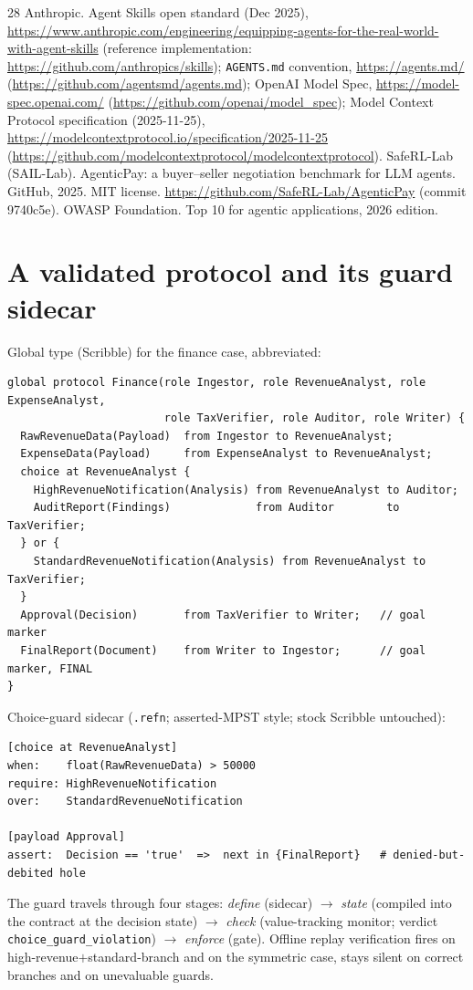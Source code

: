 \documentclass{article}
\begin{document}
\begin{thebibliography}{28}
 Anthropic. Agent Skills open standard (Dec 2025), \url{https://www.anthropic.com/engineering/equipping-agents-for-the-real-world-with-agent-skills} (reference implementation: \url{https://github.com/anthropics/skills}); \texttt{AGENTS.md} convention, \url{https://agents.md/} (\url{https://github.com/agentsmd/agents.md}); OpenAI Model Spec, \url{https://model-spec.openai.com/} (\url{https://github.com/openai/model_spec}); Model Context Protocol specification (2025-11-25), \url{https://modelcontextprotocol.io/specification/2025-11-25} (\url{https://github.com/modelcontextprotocol/modelcontextprotocol}).
 SafeRL-Lab (SAIL-Lab). AgenticPay: a buyer--seller negotiation benchmark for LLM agents. GitHub, 2025. MIT license. \url{https://github.com/SafeRL-Lab/AgenticPay} (commit 9740c5e).
 OWASP Foundation. Top 10 for agentic applications, 2026 edition.
\end{thebibliography}

\appendix
\section{A validated protocol and its guard sidecar}\label{app:scr}
Global type (Scribble) for the finance case, abbreviated:
{\small\begin{verbatim}
global protocol Finance(role Ingestor, role RevenueAnalyst, role ExpenseAnalyst,
                        role TaxVerifier, role Auditor, role Writer) {
  RawRevenueData(Payload)  from Ingestor to RevenueAnalyst;
  ExpenseData(Payload)     from ExpenseAnalyst to RevenueAnalyst;
  choice at RevenueAnalyst {
    HighRevenueNotification(Analysis) from RevenueAnalyst to Auditor;
    AuditReport(Findings)             from Auditor        to TaxVerifier;
  } or {
    StandardRevenueNotification(Analysis) from RevenueAnalyst to TaxVerifier;
  }
  Approval(Decision)       from TaxVerifier to Writer;   // goal marker
  FinalReport(Document)    from Writer to Ingestor;      // goal marker, FINAL
}
\end{verbatim}}
Choice-guard sidecar (\texttt{.refn}; asserted-MPST style; stock Scribble untouched):
{\small\begin{verbatim}
[choice at RevenueAnalyst]
when:    float(RawRevenueData) > 50000
require: HighRevenueNotification
over:    StandardRevenueNotification

[payload Approval]
assert:  Decision == 'true'  =>  next in {FinalReport}   # denied-but-debited hole
\end{verbatim}}
The guard travels through four stages: \emph{define} (sidecar) $\to$ \emph{state} (compiled into the contract at the decision state) $\to$ \emph{check} (value-tracking monitor; verdict \texttt{choice\_guard\_violation}) $\to$ \emph{enforce} (gate). Offline replay verification fires on high-revenue$+$standard-branch and on the symmetric case, stays silent on correct branches and on unevaluable guards.
\end{document}
